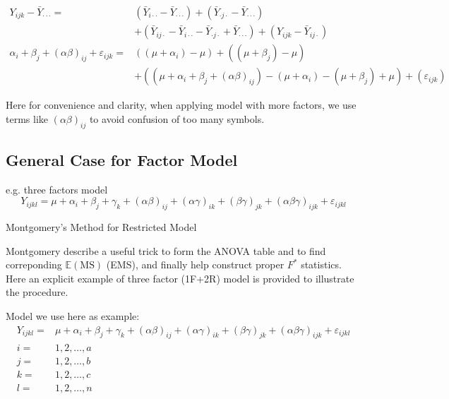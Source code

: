 \begin{align}
    Y_{ijk}-\bar{Y}_{\cdot \cdot \cdot }=&\left(\bar{Y}_{i\cdot \cdot}-\bar{Y}_{\cdot \cdot \cdot}\right)+\left(\bar{Y}_{\cdot j\cdot }-\bar{Y}_{\cdot \cdot \cdot }\right)\\
    &+\left(\bar{Y}_{ij\cdot }-\bar{Y}_{i\cdot \cdot }-\bar{Y}_{\cdot j\cdot }+\bar{Y}_{\cdot \cdot \cdot }\right)+  \left( Y_{ijk}-\bar{Y}_{ij\cdot}\right)\\
    \alpha _i+\beta _j+(\alpha \beta )_{ij}+\varepsilon _{ijk}=&\left((\mu +\alpha _i)-\mu \right)+\left((\mu +\beta _j)-\mu \right)\\
    &+\left( (\mu +\alpha _i+\beta _j+(\alpha \beta )_{ij})-(\mu +\alpha _i)-(\mu +\beta _j)+\mu  \right)+\left(\varepsilon _{ijk}\right)
    \end{align}
    
    
    
    
    
    Here for convenience and clarity, when applying model with more factors, we use terms like $ (\alpha \beta )_{ij} $ to avoid confusion of too many symbols.


\subsection{General Case for Factor Model}

e.g. three factors model 
\[
    Y_{ijkl} = \mu +\alpha _i +\beta _j+\gamma _k +(\alpha \beta )_{ij}+(\alpha \gamma )_{ik}+(\beta \gamma )_{jk}+(\alpha \beta \gamma )_{ijk}+\varepsilon _{ijkl}
\]


\begin{point}
    Montgomery's Method for Restricted Model
\end{point}

    Montgomery describe a useful trick to form the ANOVA table and to find correponding $ \mathbb{E}\left( \mathrm{MS} \right)  $ (EMS), and finally help construct proper $ F^* $ statistics.
    Here an explicit example of three factor (1F+2R) model is provided to illustrate the procedure.

    Model we use here as example:
    \begin{align}
         Y_{ijkl}=&\mu +\alpha _i+\beta _j+\gamma _k+(\alpha \beta )_{ij}+(\alpha \gamma )_{ik}+(\beta \gamma )_{jk}+(\alpha \beta \gamma )_{ijk}+\varepsilon _{ijkl}\\
         i=&1,2,\ldots,a\\
         j=&1,2,\ldots,b\\
         k=&1,2,\ldots,c\\
         l=&1,2,\ldots,n
    \end{align}

